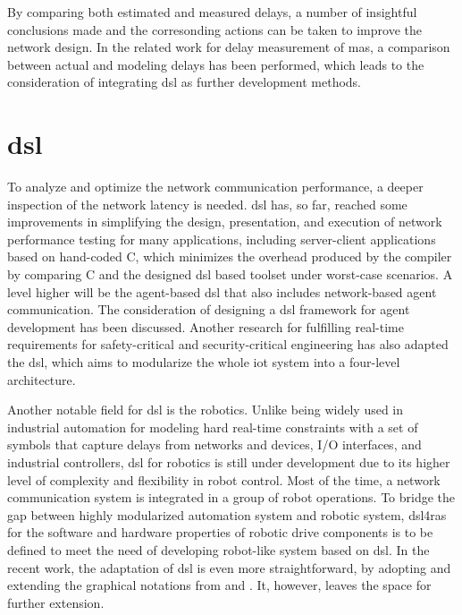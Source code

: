 By comparing both estimated and measured delays, a number of insightful 
conclusions made and the corresonding actions can be taken to improve 
the network design.
In the related work for delay measurement of \gls{mas}, 
a comparison between actual and modeling 
delays has been performed\cite{vogel-heuser_delay_2023}, which leads to the 
consideration of integrating \gls{dsl} as further development methods.





\section{\gls{dsl}}
To analyze and optimize the network communication performance, a deeper 
inspection of the network latency is needed. \gls{dsl} has, so far, reached 
some improvements in simplifying the design, presentation, and execution of 
network performance testing for many applications, including server-client applications 
based on hand-coded C, which minimizes the overhead produced by the compiler by 
comparing C and the designed \gls{dsl} based toolset under worst-case scenarios.
A level higher will be the agent-based \gls{dsl} that also includes network-based 
agent communication. The consideration of designing a \gls{dsl} framework 
for agent development has been discussed\cite{judith_domain_2013}. Another 
research for fulfilling real-time requirements for safety-critical and 
security-critical engineering has also adapted the \gls{dsl}, which aims to 
modularize the whole \gls{iot} system into a four-level architecture\cite{sklyar_domain_2022}. 



Another notable field for \gls{dsl} is the robotics. Unlike being widely 
used in industrial automation for modeling hard real-time constraints with 
a set of symbols that capture delays from networks and devices, I/O interfaces, 
and industrial controllers\cite{hujo_toward_2022}, \gls{dsl} for robotics is still 
under development due to its higher level of complexity and flexibility in 
robot control. Most of the time, a network communication system is integrated in a group 
of robot operations. To bridge the gap between highly modularized automation system 
and robotic system, \gls{dsl4ras} for the software and hardware 
properties of robotic drive components is to be defined to meet the need 
of developing robot-like system based on \gls{dsl}. In the recent work\cite{vogel-heuser_delay_2023}, 
the adaptation of \gls{dsl} is even more straightforward, by adopting and 
extending the graphical notations 
from \cite{hujo_toward_2022} and \cite{volpert_supporting_nodate}. It, however, 
leaves the space for further extension. 



